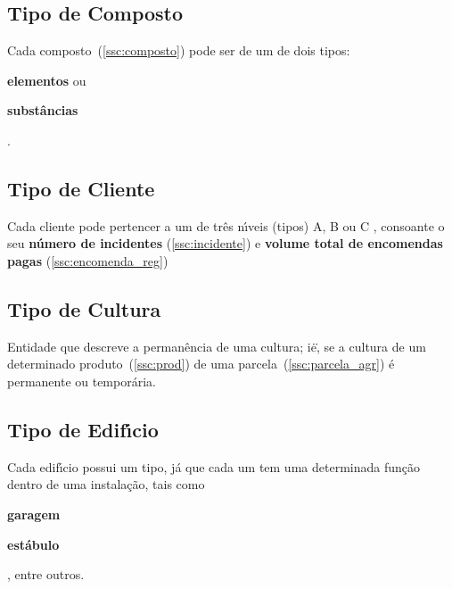 \documentclass[12pt, a4paper]{article}
\begin{document}

\subsection{Tipo de Composto}\label{ssc:tipo_composto}

Cada composto~(\ref{ssc:composto}) pode ser de um de dois tipos:
\begin{enumerate*}[label = (\roman*)]
    \item \textbf{elementos}
        ou
    \item \textbf{subst\^ancias}
\end{enumerate*}.


\subsection{Tipo de Cliente}\label{ssc:tipo_cliente}

Cada cliente pode pertencer a um de tr\^es n\'{\i}veis (tipos) {\textemdash}
A, B ou C {\textemdash},
consoante o seu \textbf{n\'umero de incidentes} (\ref{ssc:incidente})
e \textbf{volume total de encomendas pagas} (\ref{ssc:encomenda_reg})



\subsection{Tipo de Cultura}\label{ssc:tipo_cult}

Entidade que descreve a perman\^encia de uma cultura; i\.e\., se a cultura de um determinado
produto~(\ref{ssc:prod}) de uma parcela~(\ref{ssc:parcela_agr}) \'e permanente ou tempor\'aria.


\subsection{Tipo de Edif\'{\i}cio}\label{ssc:tipoedificio}

Cada edif\'{\i}cio possui um tipo, j\'a que cada um tem uma determinada fun\c{c}\~ao
dentro de uma instala\c{c}\~ao, tais como
\begin{enumerate*}[label = (\roman*)]
    \item \textbf{garagem}
    \item \textbf{est\'abulo}
\end{enumerate*}, entre outros.
\end{document}
